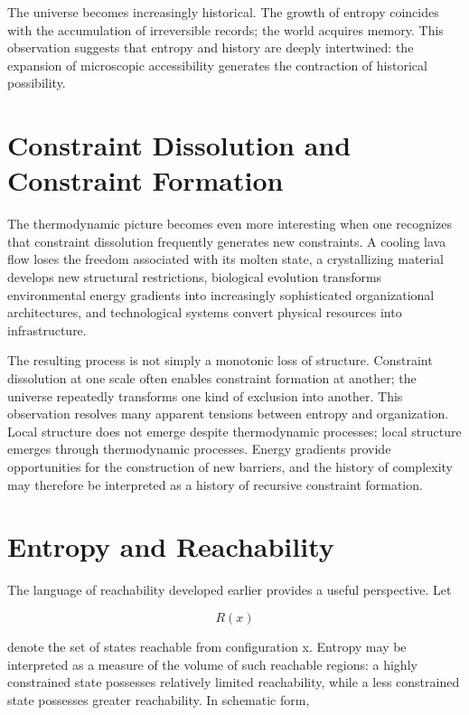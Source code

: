 \documentclass[11pt,oneside]{book}
\theoremstyle{plain}
\theoremstyle{definition}
\theoremstyle{remark}
\begin{document}
The universe becomes increasingly historical. The growth of entropy coincides with the accumulation of irreversible records; the world acquires memory. This observation suggests that entropy and history are deeply intertwined: the expansion of microscopic accessibility generates the contraction of historical possibility.

\section{Constraint Dissolution and Constraint Formation}

The thermodynamic picture becomes even more interesting when one recognizes that constraint dissolution frequently generates new constraints. A cooling lava flow loses the freedom associated with its molten state, a crystallizing material develops new structural restrictions, biological evolution transforms environmental energy gradients into increasingly sophisticated organizational architectures, and technological systems convert physical resources into infrastructure.

The resulting process is not simply a monotonic loss of structure. Constraint dissolution at one scale often enables constraint formation at another; the universe repeatedly transforms one kind of exclusion into another. This observation resolves many apparent tensions between entropy and organization. Local structure does not emerge despite thermodynamic processes; local structure emerges through thermodynamic processes. Energy gradients provide opportunities for the construction of new barriers, and the history of complexity may therefore be interpreted as a history of recursive constraint formation.

\section{Entropy and Reachability}

The language of reachability developed earlier provides a useful perspective. Let

\begin{equation}
R(x)
\end{equation}

denote the set of states reachable from configuration x. Entropy may be interpreted as a measure of the volume of such reachable regions: a highly constrained state possesses relatively limited reachability, while a less constrained state possesses greater reachability. In schematic form,
\end{document}
